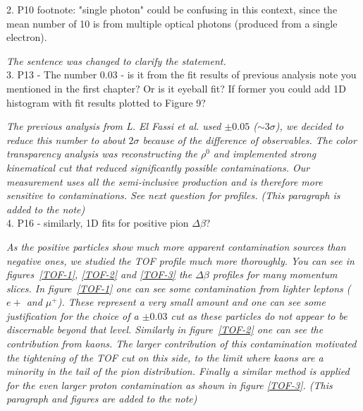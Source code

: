 \documentclass[12pt]{article}
\begin{document}
2.
P10 footnote: "single photon" could be confusing in this context, since the mean number of 
10 is from multiple optical photons (produced from a single electron).

{\it The sentence was changed to clarify the statement.}\\

3.
P13 - The number 0.03 - is it from the fit results of previous analysis note you mentioned in 
the first chapter? Or is it eyeball fit? If former you could add 1D histogram with fit results 
plotted to Figure 9?

{\it The previous analysis from L. El Fassi et al. used $\pm 0.05$ ($\sim 3\sigma$), we decided
to reduce this number to about $2\sigma$ because of the difference of observables. The 
color transparency analysis was reconstructing the $\rho^0$ and implemented strong kinematical
cut that reduced significantly possible contaminations. Our measurement uses all the 
semi-inclusive production and is therefore more sensitive to contaminations. See next 
question for profiles. (This paragraph is added to the note)}\\

4.
P16 - similarly, 1D fits for positive pion $\Delta\beta$?

{\it As the positive particles show much more apparent contamination sources than negative 
ones, we studied 
the TOF profile much more thoroughly. You can see in figures~\ref{TOF-1}, \ref{TOF-2} and 
\ref{TOF-3} the $\Delta \beta$ profiles for many momentum slices. In figure~\ref{TOF-1}
one can see some contamination from lighter leptons ($e+$ and $\mu^+$). These represent
a very small amount and one can see some justification for the choice of a $\pm 0.03$
cut as these particles do not appear to be discernable beyond that level. Similarly
in figure~\ref{TOF-2} one can see the contribution from kaons. The larger contribution
of this contamination motivated the tightening of the TOF cut on this side, to the limit
where kaons are a minority in the tail of the pion distribution. Finally a similar 
method is applied for the even larger proton contamination as shown in figure \ref{TOF-3}.
 (This paragraph and figures are added to the note)}\\
\end{document}
